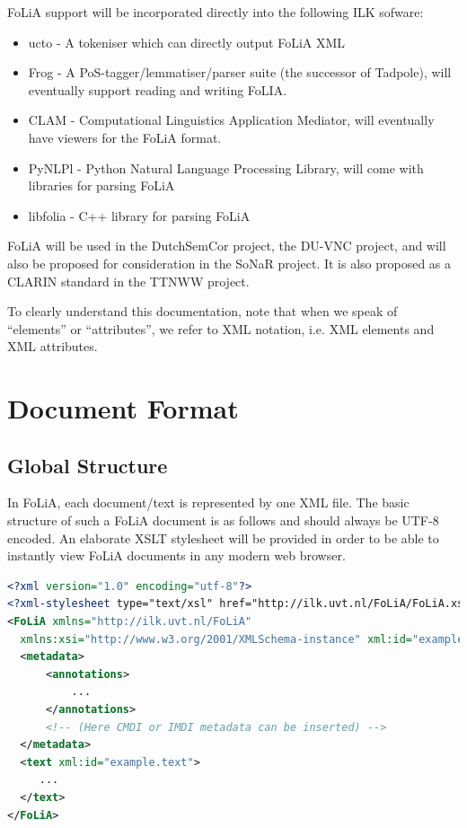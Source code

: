 \documentclass[a4paper,12pt]{report}
\begin{document}
FoLiA support will be incorporated directly into the following ILK sofware:

\begin{itemize} 
\item ucto - A tokeniser which can directly output FoLiA XML 
\item Frog - A PoS-tagger/lemmatiser/parser suite (the successor of Tadpole), will eventually support reading and writing FoLIA.
\item CLAM - Computational Linguistics Application Mediator, will eventually have viewers for the FoLiA format.
\item PyNLPl - Python Natural Language Processing Library, will come with libraries for parsing FoLiA
\item libfolia - C++ library for parsing FoLiA
\end{itemize}

FoLiA will be used in the DutchSemCor project, the DU-VNC project, and will also be proposed for consideration in the SoNaR project. It is also proposed as a CLARIN standard in the TTNWW project.

To clearly understand this documentation, note that when we speak of ``elements'' or ``attributes'', we refer to XML notation, i.e. XML elements and XML attributes.

\chapter{Document Format}

\section{Global Structure}

In FoLiA, each document/text is represented by one XML file. The basic structure of such a FoLiA document is as follows and should always be UTF-8 encoded. An elaborate XSLT stylesheet will be provided in order to be able to instantly view FoLiA documents in any modern web browser.

\begin{lstlisting}[language=xml]
<?xml version="1.0" encoding="utf-8"?>
<?xml-stylesheet type="text/xsl" href="http://ilk.uvt.nl/FoLiA/FoLiA.xsl"?>
<FoLiA xmlns="http://ilk.uvt.nl/FoLiA"
  xmlns:xsi="http://www.w3.org/2001/XMLSchema-instance" xml:id="example">
  <metadata>
      <annotations>
          ...
      </annotations>    
      <!-- (Here CMDI or IMDI metadata can be inserted) -->
  </metadata>
  <text xml:id="example.text">
     ...
  </text>
</FoLiA>  
\end{lstlisting}
\end{document}

